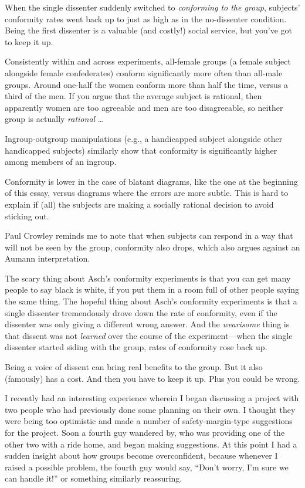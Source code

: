{
 When the single dissenter suddenly switched to \textit{conforming
to the group}, subjects' conformity rates went back up
to just as high as in the no-dissenter condition. Being the first
dissenter is a valuable (and costly!) social service, but
you've got to keep it up.}

{
 Consistently within and across experiments, all-female groups (a
female subject alongside female confederates) conform significantly
more often than all-male groups. Around one-half the women conform more
than half the time, versus a third of the men. If you argue that the
average subject is rational, then apparently women are too agreeable
and men are too disagreeable, so neither group is actually
\textit{rational} \ldots}

{
 Ingroup-outgroup manipulations (e.g., a handicapped subject
alongside other handicapped subjects) similarly show that conformity is
significantly higher among members of an ingroup.}

{
 Conformity is lower in the case of blatant diagrams, like the one
at the beginning of this essay, versus diagrams where the errors are
more subtle. This is hard to explain if (all) the subjects are making a
socially rational decision to avoid sticking out.}

{
 Paul Crowley reminds me to note that when subjects can respond in
a way that will not be seen by the group, conformity also drops, which
also argues against an Aumann interpretation.}

\myendsectiontext


\bigskip


{
 The scary thing about Asch's conformity
experiments is that you can get many people to say black is white, if
you put them in a room full of other people saying the same thing. The
hopeful thing about Asch's conformity experiments is
that a single dissenter tremendously drove down the rate of conformity,
even if the dissenter was only giving a different wrong answer. And the
\textit{wearisome} thing is that dissent was not \textit{learned} over
the course of the experiment---when the single dissenter started siding
with the group, rates of conformity rose back up. }

{
 Being a voice of dissent can bring real benefits to the group. But
it also (famously) has a cost. And then you have to keep it up. Plus
you could be wrong.}

{
 I recently had an interesting experience wherein I began
discussing a project with two people who had previously done some
planning on their own. I thought they were being too optimistic and
made a number of safety-margin-type suggestions for the project. Soon a
fourth guy wandered by, who was providing one of the other two with a
ride home, and began making suggestions. At this point I had a sudden
insight about how groups become overconfident, because whenever I
raised a possible problem, the fourth guy would say,
``Don't worry, I'm
sure we can handle it!'' or something similarly
reassuring.}

